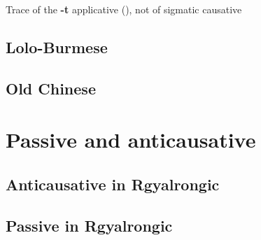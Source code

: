 \documentclass[oneside,a4paper,11pt]{article}
\newcommand{\ipa}[1]{\textbf{{\phon\mbox{#1}}}} %
\newcommand{\zh}[1]{{\cn #1}}
\newcommand{\forme}[2]{\ipa{#1} `#2'}
\begin{document}
Trace of the \ipa{-t} applicative (\citealt{michailovsky85dental, jacques15derivational.khaling}), not of sigmatic causative
\subsection{Lolo-Burmese}
\subsection{Old Chinese}


\section{Passive and anticausative}

\subsection{Anticausative in Rgyalrongic}
%
%
%
% 
%
%
% 

% 
% 
% 
%

\subsection{Passive in Rgyalrongic}
 
 
\end{document}
